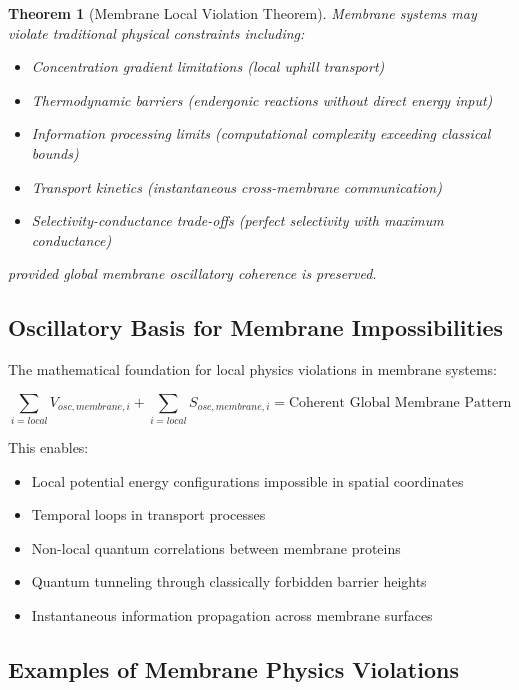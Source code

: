 \documentclass[12pt,a4paper]{article}
\newtheorem{theorem}{Theorem}
\begin{document}
\begin{theorem}[Membrane Local Violation Theorem]
Membrane systems may violate traditional physical constraints including:
\begin{itemize}
\item Concentration gradient limitations (local uphill transport)
\item Thermodynamic barriers (endergonic reactions without direct energy input)
\item Information processing limits (computational complexity exceeding classical bounds)
\item Transport kinetics (instantaneous cross-membrane communication)
\item Selectivity-conductance trade-offs (perfect selectivity with maximum conductance)
\end{itemize}
provided global membrane oscillatory coherence is preserved.
\end{theorem}

\subsection{Oscillatory Basis for Membrane Impossibilities}

The mathematical foundation for local physics violations in membrane systems:

\begin{equation}
\sum_{i=local} V_{osc,membrane,i} + \sum_{i=local} S_{osc,membrane,i} = \text{Coherent Global Membrane Pattern}
\end{equation}

This enables:
\begin{itemize}
\item Local potential energy configurations impossible in spatial coordinates
\item Temporal loops in transport processes
\item Non-local quantum correlations between membrane proteins
\item Quantum tunneling through classically forbidden barrier heights
\item Instantaneous information propagation across membrane surfaces
\end{itemize}

\subsection{Examples of Membrane Physics Violations}
\end{document}
